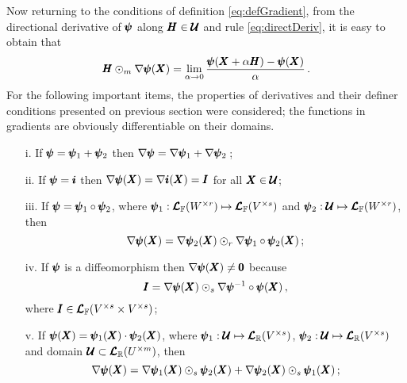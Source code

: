 Now returning to the conditions of definition \eqref{eq:defGradient}, from the directional derivative of $\pmb{\psi}$ along $\pmb{H}\in\pmb{\mathcal{U}}$ and rule \eqref{eq:directDeriv}, it is easy to obtain that
\begin{equation}
\pmb{H}\odot_m\nabla\pmb{\psi}(\pmb{X})=\lim_{\alpha\to 0} \dfrac{\pmb{\psi}(\pmb{X}+\alpha\pmb{H})-\pmb{\psi}(\pmb{X})}{\alpha}\,.
\end{equation}
For the following important items, the properties of derivatives and their definer conditions presented on previous section were considered; the functions in gradients are obviously differentiable on their domains.
\begin{itemize}
	\setlength\itemsep{.1em}
	\item[i.] If $\pmb{\psi}=\pmb{\psi}_1+\pmb{\psi}_2$ then $\nabla\pmb{\psi}=\nabla\pmb{\psi}_1+\nabla\pmb{\psi}_2\,$;
	\item[ii.] If $\pmb{\psi}=\pmb{i}$ then $\nabla\pmb{\psi}(\pmb{X})=\nabla\pmb{i}(\pmb{X})=\pmb{I}$ for all $\pmb{X}\in\pmb{\mathcal{U}}$;
	\item[iii.] If $\pmb{\psi}=\pmb{\psi}_1\circ\pmb{\psi}_2$, where $\pmb{\psi}_1 : \pmb{\mathcal{L}}_{\mathbb{F}}(W^{\times r}) \mapsto \pmb{\mathcal{L}}_{\mathbb{F}}(V^{\times s})$ and $\pmb{\psi}_2 : \pmb{\mathcal{U}} \mapsto \pmb{\mathcal{L}}_{\mathbb{F}}(W^{\times r})$, then
	\begin{equation}\label{eq:prop1Grad}
	\nabla\pmb{\psi}(\pmb{X}) = \nabla\pmb{\psi}_2(\pmb{X}) \odot_r \nabla\pmb{\psi}_1\circ\pmb{\psi}_2(\pmb{X})\,;
	\end{equation}	
	\item[iv.] If $\pmb{\psi}$ is a diffeomorphism then $\nabla\pmb{\psi}(\pmb{X})\neq\pmb{0}$ because
	\begin{equation}\label{eq:indentDiffeo}
	\pmb{I} = \nabla\pmb{\psi}(\pmb{X}) \odot_s \nabla\pmb{\psi}^{-1}\circ\pmb{\psi}(\pmb{X})\,,
	\end{equation}
	where $\pmb{I}\in\pmb{\mathcal{L}}_{\mathbb{F}}(V^{\times s}\times V^{\times s})$;	
	\item[v.] If $\pmb{\psi}(\pmb{X})=\pmb{\psi}_1(\pmb{X})\cdot\pmb{\psi}_2(\pmb{X})$, where   $\pmb{\psi}_1 : \pmb{\mathcal{U}} \mapsto \pmb{\mathcal{L}}_{\mathbb{R}}(V^{\times s})$, $\pmb{\psi}_2 : \pmb{\mathcal{U}} \mapsto \pmb{\mathcal{L}}_{\mathbb{R}}(V^{\times s})$ and domain $\pmb{\mathcal{U}}\subset\pmb{\mathcal{L}}_{\mathbb{R}}(U^{\times m})$, then
	\begin{equation}\label{eq:prop2Grad}
	\fua{\nabla\tnr{\psi}}{\tnr{X}} = \fua{\nabla\tnr{\psi}_1}{\tnr{X}}\odot_s\fua{\tnr{\psi}_2}{\tnr{X}}+\fua{\nabla\tnr{\psi}_2}{\tnr{X}}\odot_s\fua{\tnr{\psi}_1}{\tnr{X}}\,;

\end{equation}
\end{itemize}
